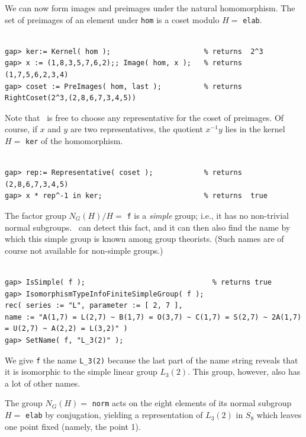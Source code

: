 We can now form images and preimages under the natural homomorphism. The set of
preimages of an element under {\tt hom} is a coset modulo $H= $ {\tt elab}. 
{\codesize
\begin{verbatim}

gap> ker:= Kernel( hom );                      % returns  2^3
gap> x := (1,8,3,5,7,6,2);; Image( hom, x );   % returns  (1,7,5,6,2,3,4)
gap> coset := PreImages( hom, last );          % returns  RightCoset(2^3,(2,8,6,7,3,4,5))

\end{verbatim}}
\noindent Note that \gap\ is free to choose any representative for the coset of preimages. Of
course, if $x$ and $y$ are two representatives, the quotient $x^{-1}y$ lies in the
kernel $H= $ {\tt ker} of the homomorphism.
{\codesize
\begin{verbatim}

gap> rep:= Representative( coset );            % returns  (2,8,6,7,3,4,5)
gap> x * rep^-1 in ker;                        % returns  true

\end{verbatim}}
\noindent The factor group $ N_G(H)/H = $ {\tt f} is a \emph{simple} group; i.e., it has no non-trivial normal
subgroups. 
\gap\ can detect this fact, and it can then also find the name by which this simple
group is known among group theorists. (Such names are of course not available for
non-simple groups.)
{\codesize
\begin{verbatim}

gap> IsSimple( f );                              % returns true
gap> IsomorphismTypeInfoFiniteSimpleGroup( f );  
rec( series := "L", parameter := [ 2, 7 ],
name := "A(1,7) = L(2,7) ~ B(1,7) = O(3,7) ~ C(1,7) = S(2,7) ~ 2A(1,7) = U(2,7) ~ A(2,2) = L(3,2)" )
gap> SetName( f, "L_3(2)" );

\end{verbatim}}
\noindent We give {\tt f} the name \verb!L_3(2)! because the last part of the name string reveals that it is isomorphic to the
simple linear group $L_3(2)$. This group, however, also has a lot of other names. 

The group $N_G(H)= $ {\tt norm} acts on the eight elements of its normal subgroup $H
= $ {\tt elab} by conjugation, yielding a representation
of $L_3(2)$ in $S_8$ which leaves one point fixed (namely, the point 1).


